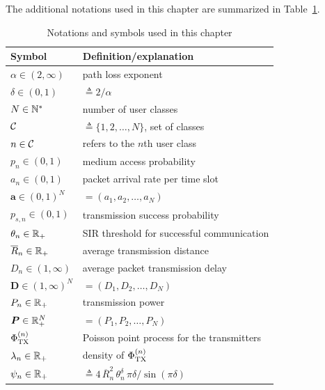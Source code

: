 The additional notations used in this chapter are summarized in Table~\ref{tab:symbols}.
%
\begin{table}[hbt]
    \centering
    \caption{Notations and symbols used in this chapter}
    \label{tab:symbols}
    \setlength{\tabcolsep}{3pt}
    \begin{tabular}{l l}
      \hline
      \hline
      \textbf{Symbol} & \textbf{Definition/explanation} \\
      \hline
        $\alpha\in(2,\infty)$	& path loss exponent \\
        $\delta\in(0,1)$		& $\triangleq 2/\alpha$ \\
        $N \in \N^*$            & number of user classes \\
        $\cal{C}$				& $\triangleq \{1,2,\dots,N\}$, set of classes \\
        $n\in\cal{C}$			& refers to the $n$th user class \\
        $p_n\in(0,1)$			& medium access probability \\
      	$a_n\in(0,1)$			& packet arrival rate per time slot \\
        $\bm{a}\in(0,1)^N$		& $=(a_1,a_2,\dots,a_N)$ \\
        $p_{s,n}\in(0,1)$		& transmission success probability \\
        $\theta_n \in\R_+$		& SIR threshold for successful communication \\
        $\overline{R}_n\in\R_+$	& average transmission distance \\
        $D_n\in(1,\infty)$		& average packet transmission delay \\
        $\bm{D}\in(1,\infty)^N$ & $=(D_1,D_2,\dots,D_N)$ \\
        $P_n\in\R_+$			& transmission power \\
        $\bm{P}\in\R_+^N$ 		& $=(P_1,P_2,\dots,P_N)$ \\
        $\Phi_\TX^{(n)}$	    & Poisson point process for the transmitters \\
        $\lambda_n\in\R_+$		& density of $\Phi_\TX^{(n)}$ \\
        $\psi_n\in\R_+$			& $\triangleq 4\,\overline{R}_n^2 \,\theta_n^{\delta}     \,\pi\delta/\sin(\pi \delta)$ \\
        \hline
      \hline
    \end{tabular}
\end{table}

\newpage

